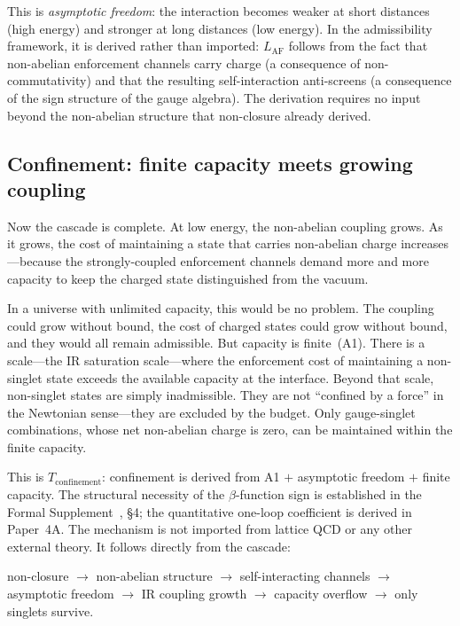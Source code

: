\documentclass[11pt]{article}
\begin{document}
This is \emph{asymptotic freedom}: the interaction becomes weaker at short distances (high energy) and stronger at long distances (low energy).  In the admissibility framework, it is derived rather than imported: $L_{\mathrm{AF}}$ follows from the fact that non-abelian enforcement channels carry charge (a consequence of non-commutativity) and that the resulting self-interaction anti-screens (a consequence of the sign structure of the gauge algebra).  The derivation requires no input beyond the non-abelian structure that non-closure already derived.

\subsection{Confinement: finite capacity meets growing coupling}

Now the cascade is complete.  At low energy, the non-abelian coupling grows.  As it grows, the cost of maintaining a state that carries non-abelian charge increases---because the strongly-coupled enforcement channels demand more and more capacity to keep the charged state distinguished from the vacuum.

In a universe with unlimited capacity, this would be no problem.  The coupling could grow without bound, the cost of charged states could grow without bound, and they would all remain admissible.  But capacity is finite~(A1).  There is a scale---the IR saturation scale---where the enforcement cost of maintaining a non-singlet state exceeds the available capacity at the interface.  Beyond that scale, non-singlet states are simply inadmissible.  They are not ``confined by a force'' in the Newtonian sense---they are excluded by the budget.  Only gauge-singlet combinations, whose net non-abelian charge is zero, can be maintained within the finite capacity.

This is $T_{\mathrm{confinement}}$: confinement is derived from A1 $+$ asymptotic freedom $+$ finite capacity.  The structural necessity of the $\beta$-function sign is established in the Formal Supplement~\cite{BrookeP2Supplement}, \S4; the quantitative one-loop coefficient is derived in Paper~4A.  The mechanism is not imported from lattice QCD or any other external theory.  It follows directly from the cascade:
\begin{center}
\small
non-closure $\to$ non-abelian structure $\to$ self-interacting channels $\to$ asymptotic freedom $\to$ IR coupling growth $\to$ capacity overflow $\to$ only singlets survive.
\end{center}
\end{document}
